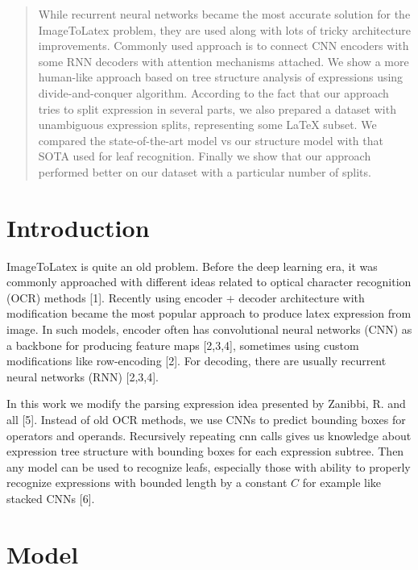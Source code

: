 \documentclass{sciposter}
\begin{document}
\begin{multicols}{3}

\begin{abstract}
While recurrent neural networks became the most accurate solution for the ImageToLatex problem, they are used along with lots of tricky architecture improvements. Commonly used approach is to connect CNN encoders with some RNN decoders with attention mechanisms attached. We show a more human-like approach based on tree structure analysis of expressions using divide-and-conquer algorithm. According to the fact that our approach tries to split expression in several parts, we also prepared a dataset with unambiguous expression splits, representing some LaTeX subset. We compared the  state-of-the-art model vs our structure model with that SOTA used for leaf recognition. Finally we show that our approach performed better on our dataset with a particular number of splits.


\end{abstract}

\section{Introduction}
ImageToLatex is quite an old problem. Before the deep learning era, it was commonly approached with different ideas related to optical character recognition (OCR) methods [1]. Recently using encoder + decoder architecture with modification became the most popular approach to produce latex expression from image. In such models, encoder often has convolutional neural networks (CNN) as a backbone for producing feature maps [2,3,4], sometimes using custom modifications like row-encoding [2]. For decoding, there are usually recurrent neural networks (RNN) [2,3,4]. 

In this work we modify the parsing expression idea presented by Zanibbi, R. and all [5]. Instead of old OCR methods, we use CNNs to predict bounding boxes for operators and operands. Recursively repeating cnn calls gives us knowledge about expression tree structure with bounding boxes for each expression subtree. Then any model can be used to recognize leafs, especially those with ability to properly recognize expressions with bounded length by a constant $C$ for example like stacked CNNs [6].

\section{Model}

\end{multicols}
\end{document}
